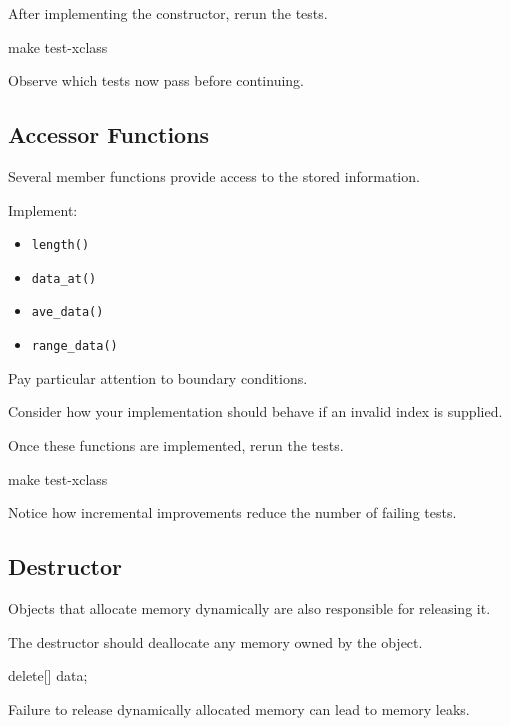 \documentclass{csc2059practical}
\begin{document}
After implementing the constructor, rerun the tests.

\begin{terminal}
make test-xclass
\end{terminal}

Observe which tests now pass before continuing.

\subsection*{Accessor Functions}

Several member functions provide access to the stored information.

Implement:

\begin{itemize}

\item \texttt{length()}

\item \texttt{data\_at()}

\item \texttt{ave\_data()}

\item \texttt{range\_data()}

\end{itemize}

Pay particular attention to boundary conditions.

Consider how your implementation should behave if an invalid index is
supplied.

Once these functions are implemented, rerun the tests.

\begin{terminal}
make test-xclass
\end{terminal}

Notice how incremental improvements reduce the number of failing tests.

\subsection*{Destructor}

Objects that allocate memory dynamically are also responsible for
releasing it.

The destructor should deallocate any memory owned by the object.

\begin{cppcode}
delete[] data;
\end{cppcode}

Failure to release dynamically allocated memory can lead to memory
leaks.
\end{document}
